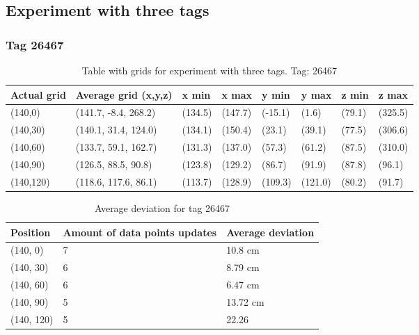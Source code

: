 \subsection{Experiment with three tags}
\subsubsection{Tag 26467}
\begin{table}[H] 
    \begin{tabular}{|l|l|l|l|l|l|l|l|}
    \hline
    Actual grid  & Average grid (x,y,z)      & x min       & x max      & y min      & y max       & z min      & z max    \\ \hline
    (140,0) 	& (141.7, -8.4, 268.2) 	 & (134.5) 	& (147.7)	& (-15.1)	 & (1.6) 	 & (79.1)	 & (325.5)	\\ \hline
    (140,30) 	& (140.1, 31.4, 124.0) 	 & (134.1) 	& (150.4)	& (23.1)	 & (39.1) 	 & (77.5)	 & (306.6)	\\ \hline
    (140,60) 	& (133.7, 59.1, 162.7) 	 & (131.3) 	& (137.0)	& (57.3)	 & (61.2) 	 & (87.5)	 & (310.0)	\\ \hline
    (140,90) 	& (126.5, 88.5, 90.8) 	 & (123.8) 	& (129.2)	& (86.7)	 & (91.9) 	 & (87.8)	 & (96.1)	\\ \hline
    (140,120) 	& (118.6, 117.6, 86.1) 	 & (113.7) 	& (128.9)	& (109.3)	 & (121.0) 	 & (80.2)	 & (91.7)	\\ \hline
    \end{tabular}
\label{Tab:three-tag-experiment-result-tag-26467}
\caption{Table with grids for experiment with three tags. Tag: 26467}
\end{table}

\begin{table}[H]
    \centering
    \begin{tabular}{|l|l|l|}
    \hline
    Position   & Amount of data points updates  & Average deviation \\ \hline
    (140, 0)   & 7                              & 10.8 cm             \\ \hline
    (140, 30)  & 6                              & 8.79 cm             \\ \hline
    (140, 60)  & 6                              & 6.47 cm              \\ \hline
    (140, 90)  & 5                              & 13.72 cm             \\ \hline
    (140, 120) & 5                              & 22.26             \\ \hline
    \end{tabular}
    \caption{Average deviation for tag 26467}
\end{table}

